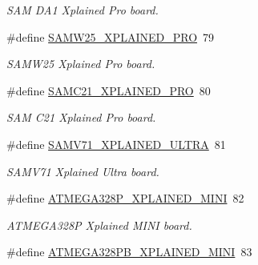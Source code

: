 \begin{DoxyCompactItemize}
\begin{DoxyCompactList}\small\item\em S\+A\+M D\+A1 Xplained Pro board. \end{DoxyCompactList}\item 
\hypertarget{group__group__common__boards_ga7b175e5ef388a7ecc2a76035003d27cd}{}\#define \hyperlink{group__group__common__boards_ga7b175e5ef388a7ecc2a76035003d27cd}{S\+A\+M\+W25\+\_\+\+X\+P\+L\+A\+I\+N\+E\+D\+\_\+\+P\+R\+O}~79\label{group__group__common__boards_ga7b175e5ef388a7ecc2a76035003d27cd}

\begin{DoxyCompactList}\small\item\em S\+A\+M\+W25 Xplained Pro board. \end{DoxyCompactList}\item 
\hypertarget{group__group__common__boards_gaab91b16ed61441fc1c048fb6f6aa50d7}{}\#define \hyperlink{group__group__common__boards_gaab91b16ed61441fc1c048fb6f6aa50d7}{S\+A\+M\+C21\+\_\+\+X\+P\+L\+A\+I\+N\+E\+D\+\_\+\+P\+R\+O}~80\label{group__group__common__boards_gaab91b16ed61441fc1c048fb6f6aa50d7}

\begin{DoxyCompactList}\small\item\em S\+A\+M C21 Xplained Pro board. \end{DoxyCompactList}\item 
\hypertarget{group__group__common__boards_ga373b1689d08782aaa2edb8d3eac814a5}{}\#define \hyperlink{group__group__common__boards_ga373b1689d08782aaa2edb8d3eac814a5}{S\+A\+M\+V71\+\_\+\+X\+P\+L\+A\+I\+N\+E\+D\+\_\+\+U\+L\+T\+R\+A}~81\label{group__group__common__boards_ga373b1689d08782aaa2edb8d3eac814a5}

\begin{DoxyCompactList}\small\item\em S\+A\+M\+V71 Xplained Ultra board. \end{DoxyCompactList}\item 
\hypertarget{group__group__common__boards_ga67a83231641bdefdc8a27565d50c82db}{}\#define \hyperlink{group__group__common__boards_ga67a83231641bdefdc8a27565d50c82db}{A\+T\+M\+E\+G\+A328\+P\+\_\+\+X\+P\+L\+A\+I\+N\+E\+D\+\_\+\+M\+I\+N\+I}~82\label{group__group__common__boards_ga67a83231641bdefdc8a27565d50c82db}

\begin{DoxyCompactList}\small\item\em A\+T\+M\+E\+G\+A328\+P Xplained M\+I\+N\+I board. \end{DoxyCompactList}\item 
\hypertarget{group__group__common__boards_ga26330ad1839acf2f969b5086e6d9687c}{}\#define \hyperlink{group__group__common__boards_ga26330ad1839acf2f969b5086e6d9687c}{A\+T\+M\+E\+G\+A328\+P\+B\+\_\+\+X\+P\+L\+A\+I\+N\+E\+D\+\_\+\+M\+I\+N\+I}~83\label{group__group__common__boards_ga26330ad1839acf2f969b5086e6d9687c}


\end{DoxyCompactItemize}
